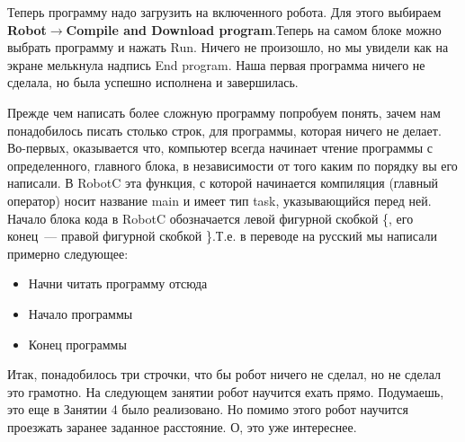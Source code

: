 Теперь программу надо загрузить на включенного робота. Для этого выбираем {\bfseries Robot\(\to\)Compile and Download program}.Теперь на самом блоке можно выбрать программу и нажать Run. Ничего не произошло, но мы увидели как на экране мелькнула надпись End program. Наша первая программа ничего не сделала, но была успешно исполнена и завершилась. 

Прежде чем написать более сложную программу попробуем понять, зачем нам понадобилось писать столько строк, для программы, которая ничего не делает. Во-первых, оказывается что, компьютер всегда начинает чтение программы с определенного, главного блока, в независимости от того каким по порядку вы его написали. В  RobotC  эта функция, с которой начинается компиляция (главный оператор) носит название main и имеет тип task, указывающийся перед ней. Начало блока кода в RobotC обозначается левой фигурной скобкой \{, его конец~--- правой фигурной скобкой \}.Т.е. в переводе на русский мы написали примерно следующее:
\begin{itemize}
	\renewcommand{\textbullet}{\textendash}
	\item Начни читать программу отсюда
	\item Начало программы
	\item Конец программы
\end{itemize}

Итак, понадобилось три строчки, что бы робот ничего не сделал, но не сделал это грамотно. На следующем занятии робот научится ехать прямо. Подумаешь, это еще в Занятии 4 было реализовано. Но помимо этого робот научится проезжать заранее заданное расстояние. О, это уже интереснее.